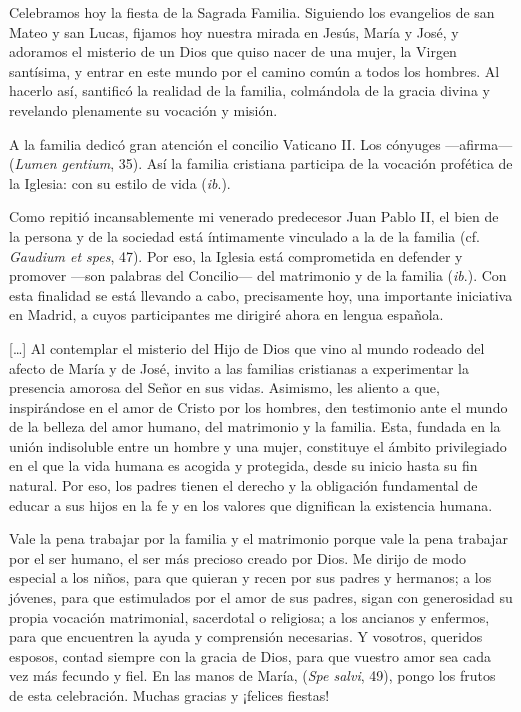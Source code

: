 				\begin{body}
					Celebramos hoy la fiesta de la Sagrada Familia. Siguiendo los evangelios de san Mateo y san Lucas, fijamos hoy nuestra mirada en Jesús, María y José, y adoramos el misterio de un Dios que quiso nacer de una mujer, la Virgen santísima, y entrar en este mundo por el camino común a todos los hombres. Al hacerlo así, santificó la realidad de la familia, colmándola de la gracia divina y revelando plenamente su vocación y misión.
					
					A la familia dedicó gran atención el concilio Vaticano II. Los cónyuges ---afirma---  (\emph{Lumen gentium}, 35). Así la familia cristiana participa de la vocación profética de la Iglesia: con su estilo de vida  (\emph{ib}.).
					
					Como repitió incansablemente mi venerado predecesor Juan Pablo II, el bien de la persona y de la sociedad está íntimamente vinculado a la  de la familia (cf. \emph{Gaudium et spes}, 47). Por eso, la Iglesia está comprometida en defender y promover  ---son palabras del Concilio--- del matrimonio y de la familia (\emph{ib}.). Con esta finalidad se está llevando a cabo, precisamente hoy, una importante iniciativa en Madrid, a cuyos participantes me dirigiré ahora en lengua española.
					
					[\ldots{}] Al contemplar el misterio del Hijo de Dios que vino al mundo rodeado del afecto de María y de José, invito a las familias cristianas a experimentar la presencia amorosa del Señor en sus vidas. Asimismo, les aliento a que, inspirándose en el amor de Cristo por los hombres, den testimonio ante el mundo de la belleza del amor humano, del matrimonio y la familia. Esta, fundada en la unión indisoluble entre un hombre y una mujer, constituye el ámbito privilegiado en el que la vida humana es acogida y protegida, desde su inicio hasta su fin natural. Por eso, los padres tienen el derecho y la obligación fundamental de educar a sus hijos en la fe y en los valores que dignifican la existencia humana.
					
					Vale la pena trabajar por la familia y el matrimonio porque vale la pena trabajar por el ser humano, el ser más precioso creado por Dios. Me dirijo de modo especial a los niños, para que quieran y recen por sus padres y hermanos; a los jóvenes, para que estimulados por el amor de sus padres, sigan con generosidad su propia vocación matrimonial, sacerdotal o religiosa; a los ancianos y enfermos, para que encuentren la ayuda y comprensión necesarias. Y vosotros, queridos esposos, contad siempre con la gracia de Dios, para que vuestro amor sea cada vez más fecundo y fiel. En las manos de María,  (\emph{Spe salvi}, 49), pongo los frutos de esta celebración. Muchas gracias y ¡felices fiestas!
					

\end{body}
